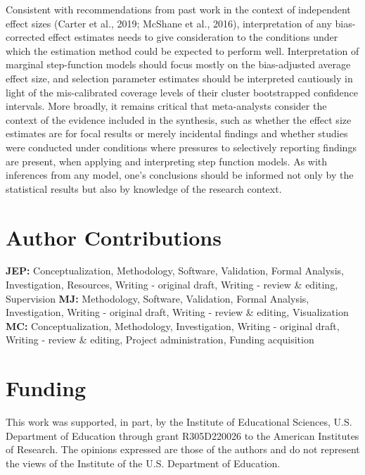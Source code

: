 \documentclass[
  american,
  man, donotrepeattitle,floatsintext]{apa7}
\begin{document}
Consistent with recommendations from past work in the context of independent effect sizes (Carter et al., 2019; McShane et al., 2016), interpretation of any bias-corrected effect estimates needs to give consideration to the conditions under which the estimation method could be expected to perform well.
Interpretation of marginal step-function models should focus mostly on the bias-adjusted average effect size, and selection parameter estimates should be interpreted cautiously in light of the mis-calibrated coverage levels of their cluster bootstrapped confidence intervals.
More broadly, it remains critical that meta-analysts consider the context of the evidence included in the synthesis, such as whether the effect size estimates are for focal results or merely incidental findings and whether studies were conducted under conditions where pressures to selectively reporting findings are present, when applying and interpreting step function models.
As with inferences from any model, one's conclusions should be informed not only by the statistical results but also by knowledge of the research context.

\section*{Author Contributions}\label{author-contributions}

\textbf{JEP:} Conceptualization, Methodology, Software, Validation, Formal Analysis, Investigation, Resources, Writing - original draft, Writing - review \& editing, Supervision \textbf{MJ:} Methodology, Software, Validation, Formal Analysis, Investigation, Writing - original draft, Writing - review \& editing, Visualization \textbf{MC:} Conceptualization, Methodology, Investigation, Writing - original draft, Writing - review \& editing, Project administration, Funding acquisition

\section*{Funding}\label{funding}

This work was supported, in part, by the Institute of Educational Sciences, U.S. Department of Education through grant R305D220026 to the American Institutes of Research.
The opinions expressed are those of the authors and do not represent the views of the Institute of the U.S. Department of Education.
\end{document}
